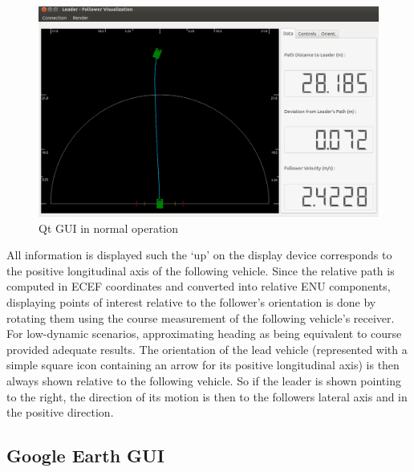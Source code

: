\documentclass[twocolumn,10pt]{article}
\begin{document}
    \begin{figure}[ht] \centering
      \includegraphics[width=\columnwidth] {../graphics/final_design_data.png}
      \caption{Qt GUI in normal operation}
      \label{fig:qt_normal}
    \end{figure}

    All information is displayed such the `up' on the display device corresponds to the positive longitudinal axis of the following vehicle.
    Since the relative path is computed in ECEF coordinates and converted into relative ENU components, displaying points of interest relative to the follower's orientation is done by rotating them using the course measurement of the following vehicle's receiver. For low-dynamic scenarios, approximating heading as being equivalent to course provided adequate results.
    The orientation of the lead vehicle (represented with a simple square icon containing an arrow for its positive longitudinal axis) is then always shown relative to the following vehicle.  So if the leader is shown pointing to the right, the direction of its motion is then to the followers lateral axis and in the positive direction. 


  \subsection*{Google Earth GUI}
\end{document}
